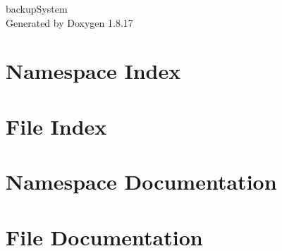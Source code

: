 \let\mypdfximage\pdfximage\def\pdfximage{\immediate\mypdfximage}\documentclass[twoside]{book}
\newcommand{\+}{\discretionary{\mbox{\scriptsize$\hookleftarrow$}}{}{}}
\newcommand{\clearemptydoublepage}{%
  \newpage{\pagestyle{empty}\cleardoublepage}%
}
\begin{document}
\hypersetup{pageanchor=false,
             bookmarksnumbered=true,
             pdfencoding=unicode
            }
\begin{titlepage}
\vspace*{7cm}
\begin{center}%
{\Large backup\+System }\\
\vspace*{1cm}
{\large Generated by Doxygen 1.8.17}\\
\end{center}
\end{titlepage}
\clearemptydoublepage
{}
\tableofcontents
\clearemptydoublepage
{}
\hypersetup{pageanchor=true}

\chapter{Namespace Index}

\chapter{File Index}

\chapter{Namespace Documentation}
















\chapter{File Documentation}

















\backmatter
\newpage
{}
\clearemptydoublepage
{}
\printindex
\end{document}
